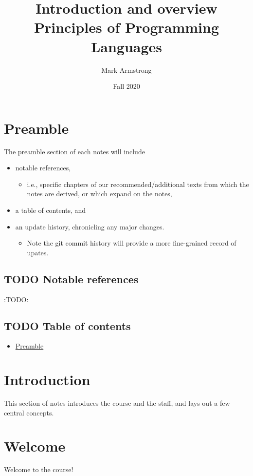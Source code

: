 \documentclass[11pt]{article}
\author{Mark Armstrong}
\date{Fall 2020}
\title{Introduction and overview\\\medskip
\large Principles of Programming Languages}
\theoremstyle{definition}
\begin{document}
\maketitle

\section{Preamble}
\label{sec:org78ddc8d}
The preamble section of each notes will include
\begin{itemize}
\item notable references,
\begin{itemize}
\item i.e., specific chapters of our recommended/additional texts
from which the notes are derived, or which expand on the notes,
\end{itemize}
\item a table of contents, and
\item an update history, chronicling any major changes.
\begin{itemize}
\item Note the git commit history will provide a more fine-grained
record of upates.
\end{itemize}
\end{itemize}

\subsection{{\bfseries\sffamily TODO} Notable references}
\label{sec:org534e54f}
:TODO:

\subsection{{\bfseries\sffamily TODO} Table of contents}
\label{sec:org3c3dc4d}
\begin{scriptsize}
\begin{itemize}
\item \hyperref[sec:org78ddc8d]{Preamble}
\end{itemize}
\end{scriptsize}

\section{Introduction}
\label{sec:org192cf72}
This section of notes introduces the course and the staff,
and lays out a few central concepts.

\section{Welcome}
\label{sec:org9b6f799}
\begin{center}
Welcome to the course!
\end{center}
\end{document}
